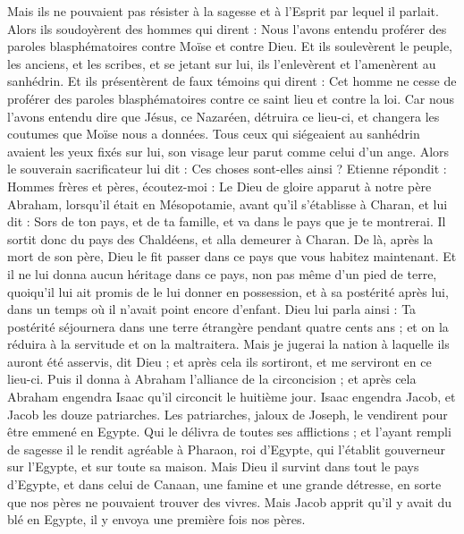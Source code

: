 \begin{multicols}{2}
{Mais ils ne pouvaient pas résister à la sagesse et à l'Esprit par lequel il parlait.
Alors ils soudoyèrent des hommes qui dirent : Nous l'avons entendu proférer des paroles blasphématoires contre Moïse et contre Dieu.
Et ils soulevèrent le peuple, les anciens, et les scribes, et se jetant sur lui, ils l'enlevèrent et l'amenèrent au sanhédrin.
Et ils présentèrent de faux témoins qui dirent : Cet homme ne cesse de proférer des paroles blasphématoires contre ce saint lieu et contre la loi.
Car nous l'avons entendu dire que Jésus, ce Nazaréen, détruira ce lieu-ci, et changera les coutumes que Moïse nous a données.
Tous ceux qui siégeaient au sanhédrin avaient les yeux fixés sur lui, son visage leur parut comme celui d'un ange.
\VerseOne{}Alors le souverain sacrificateur lui dit : Ces choses sont-elles ainsi ?
Etienne répondit : Hommes frères et pères, écoutez-moi : Le Dieu de gloire apparut à notre père Abraham, lorsqu'il était en Mésopotamie, avant qu'il s'établisse à Charan, et lui dit :
Sors de ton pays, et de ta famille, et va dans le pays que je te montrerai.
Il sortit donc du pays des Chaldéens, et alla demeurer à Charan. De là, après la mort de son père, Dieu le fit passer dans ce pays que vous habitez maintenant.
Et il ne lui donna aucun héritage dans ce pays, non pas même d'un pied de terre, quoiqu'il lui ait promis de le lui donner en possession, et à sa postérité après lui, dans un temps où il n'avait point encore d'enfant.
Dieu lui parla ainsi : Ta postérité séjournera dans une terre étrangère pendant quatre cents ans ; et on la réduira à la servitude et on la maltraitera.
Mais je jugerai la nation à laquelle ils auront été asservis, dit Dieu ; et après cela ils sortiront, et me serviront en ce lieu-ci.
Puis il donna à Abraham l'alliance de la circoncision ; et après cela Abraham engendra Isaac qu'il circoncit le huitième jour. Isaac engendra Jacob, et Jacob les douze patriarches.
Les patriarches, jaloux de Joseph, le vendirent pour être emmené en Egypte.
Qui le délivra de toutes ses afflictions ; et l'ayant rempli de sagesse il le rendit agréable à Pharaon, roi d'Egypte, qui l'établit gouverneur sur l'Egypte, et sur toute sa maison.
Mais Dieu il survint dans tout le pays d'Egypte, et dans celui de Canaan, une famine et une grande détresse, en sorte que nos pères ne pouvaient trouver des vivres.
Mais Jacob apprit qu'il y avait du blé en Egypte, il y envoya une première fois nos pères.
}
\end{multicols}
